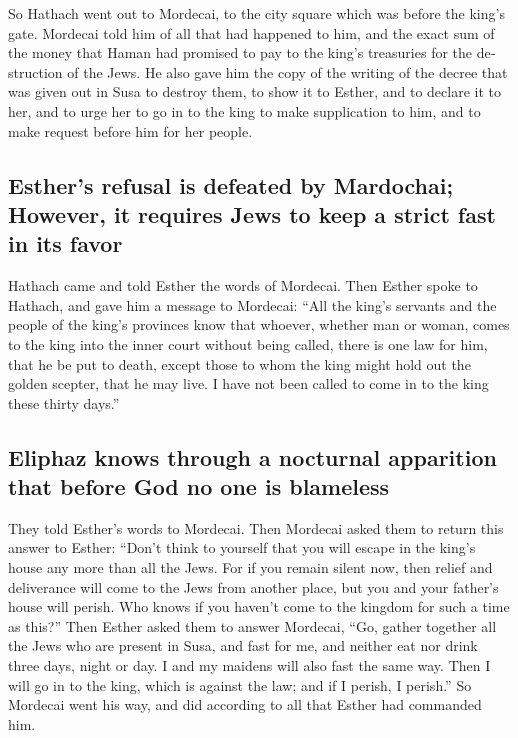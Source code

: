 \begin{paracol}{2}
\begin{otherlanguage}{english}
 So Hathach went out to Mordecai, to the city square which
was before the king's gate.  Mordecai told him of all that
had happened to him, and the exact sum of the money that Haman had
promised to pay to the king's treasuries for the destruction of the
Jews.  He also gave him the copy of the writing of the
decree that was given out in Susa to destroy them, to show it to Esther,
and to declare it to her, and to urge her to go in to the king to make
supplication to him, and to make request before him for her people.

\hypertarget{esthers-refusal-is-defeated-by-mardochai-however-it-requires-jews-to-keep-a-strict-fast-in-its-favor}{%
\subsection{Esther's refusal is defeated by Mardochai; However, it
requires Jews to keep a strict fast in its
favor}\label{esthers-refusal-is-defeated-by-mardochai-however-it-requires-jews-to-keep-a-strict-fast-in-its-favor}}

 Hathach came and told Esther the words of Mordecai.
 Then Esther spoke to Hathach, and gave him a message to
Mordecai:  ``All the king's servants and the people of
the king's provinces know that whoever, whether man or woman, comes to
the king into the inner court without being called, there is one law for
him, that he be put to death, except those to whom the king might hold
out the golden scepter, that he may live. I have not been called to come
in to the king these thirty days.''

\hypertarget{eliphaz-knows-through-a-nocturnal-apparition-that-before-god-no-one-is-blameless}{%
\subsection{Eliphaz knows through a nocturnal apparition that before God
no one is
blameless}\label{eliphaz-knows-through-a-nocturnal-apparition-that-before-god-no-one-is-blameless}}

 They told Esther's words to Mordecai. 
Then Mordecai asked them to return this answer to Esther: ``Don't think
to yourself that you will escape in the king's house any more than all
the Jews.  For if you remain silent now, then relief and
deliverance will come to the Jews from another place, but you and your
father's house will perish. Who knows if you haven't come to the kingdom
for such a time as this?''  Then Esther asked them to
answer Mordecai,  ``Go, gather together all the Jews who
are present in Susa, and fast for me, and neither eat nor drink three
days, night or day. I and my maidens will also fast the same way. Then I
will go in to the king, which is against the law; and if I perish, I
perish.''  So Mordecai went his way, and did according to
all that Esther had commanded him.


\end{otherlanguage}
\end{paracol}
